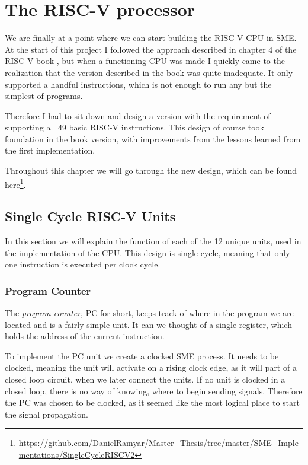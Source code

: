 \chapter{The RISC-V processor}\label{Chapter:5}
    We are finally at a point where we can start building the RISC-V CPU in SME. At the start of this project I followed the approach described in chapter 4 of the RISC-V book \cite{riscVbook}, but when a functioning CPU was made I quickly came to the realization that the version described in the book was quite inadequate. It only supported a handful instructions, which is not enough to run any but the simplest of programs. 
    
    Therefore I had to sit down and design a version with the requirement of supporting all 49 basic RISC-V instructions. This design of course took foundation in the book version, with improvements from the lessons learned from the first implementation.
    
    Throughout this chapter we will go through the new design, which can be found here\footnote{\url{https://github.com/DanielRamyar/Master_Thesis/tree/master/SME_Implementations/SingleCycleRISCV2}}.

\section{Single Cycle RISC-V Units}
    In this section we will explain the function of each of the 12 unique units, used in the implementation of the CPU. This design is single cycle, meaning that only one instruction is executed per clock cycle. 

    \subsection{Program Counter}
        The \textit{program counter}, PC for short, keeps track of where in the program we are located and is a fairly simple unit. It can we thought of a single register, which holds the address of the current instruction.
        
        To implement the PC unit we create a clocked SME process. It needs to be clocked, meaning the unit will activate on a rising clock edge, as it will part of a closed loop circuit, when we later connect the units. If no unit is clocked in a closed loop, there is no way of knowing, where to begin sending signals. Therefore the PC was chosen to be clocked, as it seemed like the most logical place to start the signal propagation.
        
